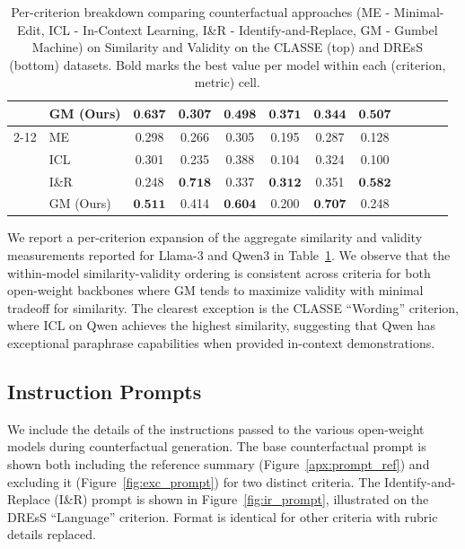 \documentclass[11pt]{article}
\begin{document}
\begin{table}[!htbp]
{\begin{tabular}{ll  cc  cc  cc  cc  cc}
  & GM (Ours) & $\textbf{0.637}$ & 0.307 & $\textbf{0.498}$ & $\textbf{0.371}$ & $\textbf{0.344}$ & $\textbf{0.507}$ & & & & \\
\cmidrule(l){2-12}
\multirow{4}{*}{Qwen}
  & ME       & 0.298 & 0.266 & 0.305 & 0.195 & 0.287 & 0.128 & & & & \\
  & ICL      & 0.301 & 0.235 & 0.388 & 0.104 & 0.324 & 0.100 & & & & \\
  & I\&R     & 0.248 & $\textbf{0.718}$ & 0.337 & $\textbf{0.312}$ & 0.351 & $\textbf{0.582}$ & & & & \\
  & GM (Ours) & $\textbf{0.511}$ & 0.414 & $\textbf{0.604}$ & 0.200 & $\textbf{0.707}$ & 0.248 & & & & \\
\bottomrule
\end{tabular}}
\caption{Per-criterion breakdown comparing counterfactual approaches (ME - Minimal-Edit, ICL - In-Context Learning, I\&R - Identify-and-Replace, GM - Gumbel Machine) on Similarity and Validity on the CLASSE (top) and DREsS (bottom) datasets. Bold marks the best value per model within each (criterion, metric) cell. }
\label{tab:appendix_per_criterion}
\end{table}
We report a per-criterion expansion of the aggregate similarity and validity measurements reported for Llama-3 and Qwen3 in 
Table~\ref{tab:appendix_per_criterion}. We observe that the within-model similarity-validity ordering is consistent across criteria for both open-weight backbones where GM tends to maximize validity with minimal tradeoff for similarity. The clearest exception is the CLASSE ``Wording'' criterion, where ICL on Qwen achieves the highest similarity, suggesting that Qwen has exceptional paraphrase capabilities when provided in-context demonstrations.

\subsection{Instruction Prompts} \label{apx:prompts}

We include the details of the instructions passed to the various open-weight models during counterfactual generation. The base counterfactual prompt is shown both including the reference summary (Figure~\ref{apx:prompt_ref}) and excluding it (Figure~\ref{fig:exc_prompt}) for two distinct criteria. The Identify-and-Replace (I\&R) prompt is shown in Figure~\ref{fig:ir_prompt}, illustrated on the DREsS ``Language'' criterion. Format is identical for other criteria with rubric details replaced.
\end{document}
